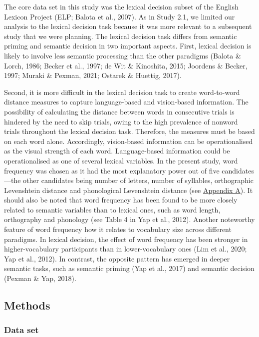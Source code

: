 \documentclass[
  12pt,
  man,floatsintext]{apa7}
\begin{document}
The core data set in this study was the lexical decision subset of the English Lexicon Project (ELP; Balota et al., 2007). As in Study 2.1, we limited our analysis to the lexical decision task because it was more relevant to a subsequent study that we were planning. The lexical decision task differs from semantic priming and semantic decision in two important aspects. First, lexical decision is likely to involve less semantic processing than the other paradigms (Balota \& Lorch, 1986; Becker et al., 1997; de Wit \& Kinoshita, 2015; Joordens \& Becker, 1997; Muraki \& Pexman, 2021; Ostarek \& Huettig, 2017).

Second, it is more difficult in the lexical decision task to create word-to-word distance measures to capture language-based and vision-based information. The possibility of calculating the distance between words in consecutive trials is hindered by the need to skip trials, owing to the high prevalence of nonword trials throughout the lexical decision task. Therefore, the measures must be based on each word alone. Accordingly, vision-based information can be operationalised as the visual strength of each word. Language-based information could be operationalised as one of several lexical variables. In the present study, word frequency was chosen as it had the most explanatory power out of five candidates---the other candidates being number of letters, number of syllables, orthographic Levenshtein distance and phonological Levenshtein distance (see \protect\hyperlink{appendix-A-lexical-covariates}{\underline{Appendix A}}). It should also be noted that word frequency has been found to be more closely related to semantic variables than to lexical ones, such as word length, orthography and phonology (see Table 4 in Yap et al., 2012). Another noteworthy feature of word frequency how it relates to vocabulary size across different paradigms. In lexical decision, the effect of word frequency has been stronger in higher-vocabulary participants than in lower-vocabulary ones (Lim et al., 2020; Yap et al., 2012). In contrast, the opposite pattern has emerged in deeper semantic tasks, such as semantic priming (Yap et al., 2017) and semantic decision (Pexman \& Yap, 2018).

\hypertarget{methods-2}{%
\subsection{Methods}\label{methods-2}}

\hypertarget{data-set-1}{%
\subsubsection{Data set}\label{data-set-1}}
\end{document}
